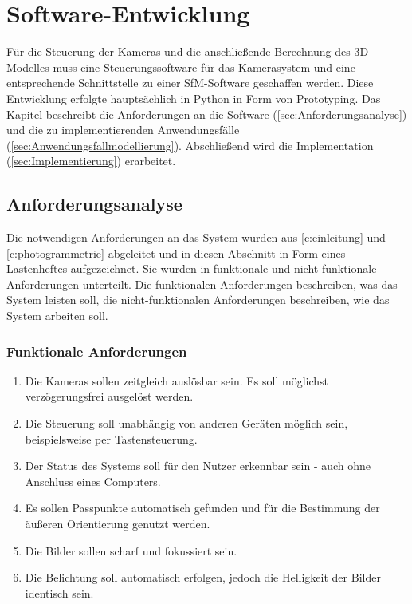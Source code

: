 \documentclass[./00PhotoBox.tex]{subfiles}
\begin{document}
\renewcommand{\itemautorefname}{Anforderung}

\chapter{Software-Entwicklung}
\label{c:software}

Für die Steuerung der Kameras und die anschließende Berechnung des 3D-Modelles muss eine Steuerungssoftware für das Kamerasystem und eine entsprechende Schnittstelle zu einer \Gls{SfM}-Software geschaffen werden. Diese Entwicklung erfolgte hauptsächlich in Python in Form von Prototyping. Das Kapitel beschreibt die Anforderungen an die Software (\autoref{sec:Anforderungsanalyse}) und die zu implementierenden Anwendungsfälle (\autoref{sec:Anwendungsfallmodellierung}). Abschließend wird die Implementation (\autoref{sec:Implementierung}) erarbeitet.

\section{Anforderungsanalyse}
\label{sec:Anforderungsanalyse}

Die notwendigen Anforderungen an das System wurden aus \autoref{c:einleitung} und \ref{c:photogrammetrie} abgeleitet und in diesen Abschnitt in Form eines Lastenheftes aufgezeichnet. Sie wurden in funktionale und nicht-funktionale Anforderungen unterteilt. Die funktionalen Anforderungen beschreiben, was das System leisten soll, die nicht-funktionalen Anforderungen beschreiben, wie das System arbeiten soll. 


\subsection{Funktionale Anforderungen}
\begin{enumerate}[label=F\arabic*]
    \item \label{e:zeitgleich} Die Kameras sollen zeitgleich auslösbar sein. Es soll möglichst ver\-zögerungs\-frei ausgelöst werden.
    \item \label{e:button} Die Steuerung soll unabhängig von anderen Geräten möglich sein, beispielsweise per Tastensteuerung.
    \item \label{e:status} Der Status des Systems soll für den Nutzer erkennbar sein - auch ohne Anschluss eines Computers.
    \item \label{e:passpunkte} Es sollen Passpunkte automatisch gefunden und für die Bestimmung der äußeren Orientierung genutzt werden.
    \item \label{e:scharf} Die Bilder sollen scharf und fokussiert sein.
    \item \label{e:licht} Die Belichtung soll automatisch erfolgen, jedoch die Helligkeit der Bilder identisch sein.
\end{enumerate}
\end{document}
